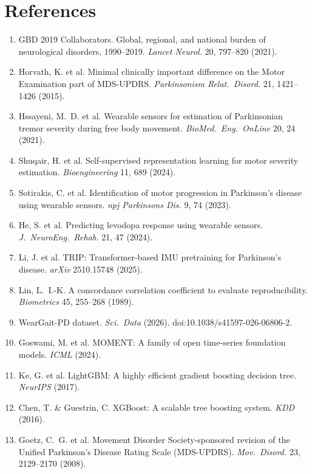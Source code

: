 \documentclass[11pt,a4paper]{article}
\begin{document}
\section*{References}
\begin{enumerate}[leftmargin=2.2em,itemsep=2pt]
\item GBD 2019 Collaborators. Global, regional, and national burden of neurological disorders, 1990--2019. \emph{Lancet Neurol.} 20, 797--820 (2021).
\item Horvath, K. et al. Minimal clinically important difference on the Motor Examination part of MDS-UPDRS. \emph{Parkinsonism Relat.\ Disord.} 21, 1421--1426 (2015).
\item Hssayeni, M.~D. et al. Wearable sensors for estimation of Parkinsonian tremor severity during free body movement. \emph{BioMed.\ Eng.\ OnLine} 20, 24 (2021).
\item Shuqair, H. et al. Self-supervised representation learning for motor severity estimation. \emph{Bioengineering} 11, 689 (2024).
\item Sotirakis, C. et al. Identification of motor progression in Parkinson's disease using wearable sensors. \emph{npj Parkinsons Dis.} 9, 74 (2023).
\item He, S. et al. Predicting levodopa response using wearable sensors. \emph{J.\ NeuroEng.\ Rehab.} 21, 47 (2024).
\item Li, J. et al. TRIP: Transformer-based IMU pretraining for Parkinson's disease. \emph{arXiv} 2510.15748 (2025).
\item Lin, L.~I.-K. A concordance correlation coefficient to evaluate reproducibility. \emph{Biometrics} 45, 255--268 (1989).
\item WearGait-PD dataset. \emph{Sci.\ Data} (2026). doi:10.1038/s41597-026-06806-2.
\item Goswami, M. et al. MOMENT: A family of open time-series foundation models. \emph{ICML} (2024).
\item Ke, G. et al. LightGBM: A highly efficient gradient boosting decision tree. \emph{NeurIPS} (2017).
\item Chen, T. \& Guestrin, C. XGBoost: A scalable tree boosting system. \emph{KDD} (2016).
\item Goetz, C.~G. et al. Movement Disorder Society-sponsored revision of the Unified Parkinson's Disease Rating Scale (MDS-UPDRS). \emph{Mov.\ Disord.} 23, 2129--2170 (2008).
\end{enumerate}
\end{document}

